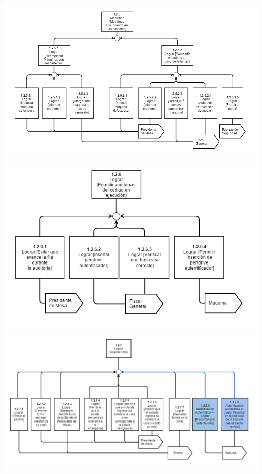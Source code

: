\\
\includegraphics[scale=0.55]{imagenes/Diagramas/12/125.png}
\\
\includegraphics[scale=0.55]{imagenes/Diagramas/12/126.png}
\\
\includegraphics[scale=0.55]{imagenes/Diagramas/12/127.png}
